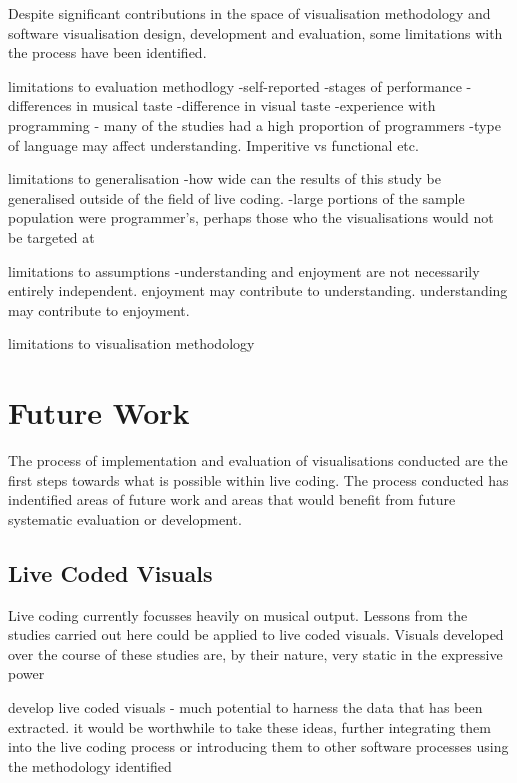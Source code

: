 Despite significant contributions in the space of visualisation methodology and software visualisation design, development and evaluation, some limitations with the process have been identified.

limitations to evaluation methodlogy
-self-reported
-stages of performance
-differences in musical taste
-difference in visual taste
-experience with programming - many of the studies had a high proportion of programmers
-type of language may affect understanding. Imperitive vs functional etc.

limitations to generalisation
-how wide can the results of this study be generalised outside of the field of live coding.
-large portions of the sample population were programmer's, perhaps those who the visualisations would not be targeted at

limitations to assumptions
-understanding and enjoyment are not necessarily entirely independent. enjoyment may contribute to understanding. understanding may contribute to enjoyment.

limitations to visualisation methodology

\section{Future Work}

The process of implementation and evaluation of visualisations conducted are the first steps towards what is possible within live coding. The process conducted has indentified areas of future work and areas that would benefit from future systematic evaluation or development.

\subsection{Live Coded Visuals}

Live coding currently focusses heavily on musical output. Lessons from the studies carried out here could be applied to live coded visuals. Visuals developed over the course of these studies are, by their nature, very static in the expressive power 

develop live coded visuals - much potential to harness the data that has been extracted. it would be worthwhile to take these ideas, further integrating them into the live coding process or introducing them to other software processes using the methodology identified

